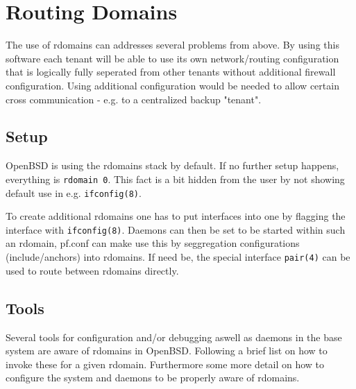 \documentclass[letterpaper,twocolumn,10pt]{article}
\begin{document}
\section{Routing Domains}
The use of rdomains can addresses several problems from above. By using this software each tenant will be able to use its own network/routing configuration that is logically fully seperated from other tenants without additional firewall configuration. Using additional configuration would be needed to allow certain cross communication - e.g. to a centralized backup "tenant".
\subsection{Setup}
OpenBSD is using the rdomains stack by default. If no further setup happens, everything is {\tt rdomain 0}. This fact is a bit hidden from the user by not showing default use in e.g. {\tt ifconfig(8)}.

To create additional rdomains one has to put interfaces into one by flagging the interface with {\tt ifconfig(8)}. Daemons can then be set to be started within such an rdomain, pf.conf can make use this by seggregation configurations (include/anchors) into rdomains. If need be, the special interface {\tt pair(4)} can be used to route between rdomains directly.

\subsection{Tools}
Several tools for configuration and/or debugging aswell as daemons in the base system are aware of
rdomains in OpenBSD. Following a brief list on how to invoke these for a given rdomain. Furthermore some
more detail on how to configure the system and daemons to be properly aware of rdomains.
\end{document}

